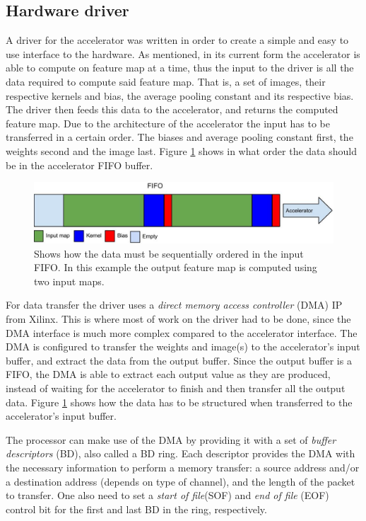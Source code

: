 \subsection{Hardware driver} \label{sec_hardware_driver}

A driver for the accelerator was written in order to create a simple and easy to use interface to the hardware. As mentioned, in its current form the accelerator is able to compute on feature map at a time, thus the input to the driver is all the data required to compute said feature map. That is, a set of images, their respective kernels and bias, the average pooling constant and its respective bias. The driver then feeds this data to the accelerator, and returns the computed feature map. Due to the architecture of the accelerator the input has to be transferred in a certain order. The biases and average pooling constant first, the weights second and the image last. Figure \ref{fig_fifo_content} shows in what order the data should be in the accelerator FIFO buffer.


\begin{figure}[h!]
  \centering
      \includegraphics[width=1.0\textwidth]{Figures/Method/FIFO_content}
    \caption[FIFO order]{Shows how the data must be sequentially ordered in the input FIFO. In this example the output feature map is computed using two input maps.}
    \label{fig_fifo_content}
\end{figure}

For data transfer the driver uses a \textit{direct memory access controller} (DMA) IP from Xilinx. This is where most of work on the driver had to be done, since the DMA interface is much more complex compared to the accelerator interface. The DMA is configured to transfer the weights and image(s) to the accelerator's input buffer, and extract the data from the output buffer. Since the output buffer is a FIFO, the DMA is able to extract each output value as they are produced, instead of waiting for the accelerator to finish and then transfer all the output data. Figure \ref{fig_fifo_content} shows how the data has to be structured when transferred to the accelerator's input buffer.

The processor can make use of the DMA by providing it with a set of \textit{buffer descriptors} (BD), also called a BD ring. Each descriptor provides the DMA with the necessary information to perform a memory transfer: a source address and/or a destination address (depends on type of channel), and the length of the packet to transfer. One also need to set a \textit{start of file}(SOF) and \textit{end of file} (EOF) control bit for the first and last BD in the ring, respectively. 

